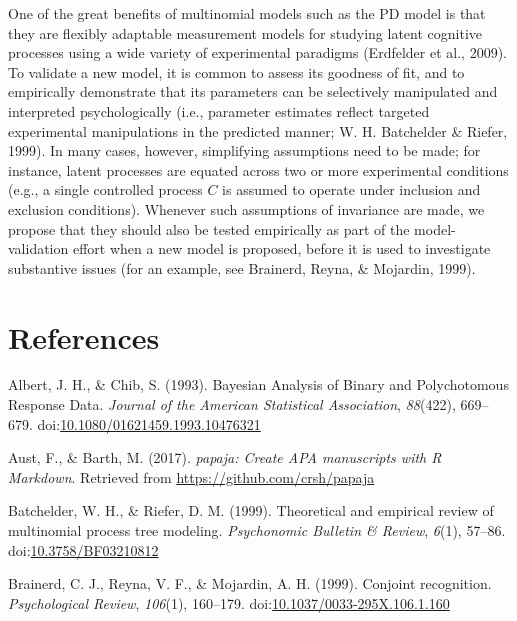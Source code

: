 \documentclass[man]{apa6}
\theoremstyle{definition}
\theoremstyle{definition}
\theoremstyle{definition}
\theoremstyle{remark}
\begin{document}
One of the great benefits of multinomial models such as the PD model is
that they are flexibly adaptable measurement models for studying latent
cognitive processes using a wide variety of experimental paradigms
(Erdfelder et al., 2009). To validate a new model, it is common to
assess its goodness of fit, and to empirically demonstrate that its
parameters can be selectively manipulated and interpreted
psychologically (i.e., parameter estimates reflect targeted experimental
manipulations in the predicted manner; W. H. Batchelder \& Riefer,
1999). In many cases, however, simplifying assumptions need to be made;
for instance, latent processes are equated across two or more
experimental conditions (e.g., a single controlled process \(C\) is
assumed to operate under inclusion and exclusion conditions). Whenever
such assumptions of invariance are made, we propose that they should
also be tested empirically as part of the model-validation effort when a
new model is proposed, before it is used to investigate substantive
issues (for an example, see Brainerd, Reyna, \& Mojardin, 1999).

\clearpage

\section{References}\label{references}

\setlength{\parindent}{-0.5in} \setlength{\leftskip}{0.5in}
\setlength{\parskip}{8pt}

\hypertarget{refs}{}
\hypertarget{ref-albert_bayesian_1993}{}
Albert, J. H., \& Chib, S. (1993). Bayesian Analysis of Binary and
Polychotomous Response Data. \emph{Journal of the American Statistical
Association}, \emph{88}(422), 669--679.
doi:\href{https://doi.org/10.1080/01621459.1993.10476321}{10.1080/01621459.1993.10476321}

\hypertarget{ref-R-papaja}{}
Aust, F., \& Barth, M. (2017). \emph{papaja: Create APA manuscripts with
R Markdown}. Retrieved from \url{https://github.com/crsh/papaja}

\hypertarget{ref-batchelder_theoretical_1999}{}
Batchelder, W. H., \& Riefer, D. M. (1999). Theoretical and empirical
review of multinomial process tree modeling. \emph{Psychonomic Bulletin
\& Review}, \emph{6}(1), 57--86.
doi:\href{https://doi.org/10.3758/BF03210812}{10.3758/BF03210812}

\hypertarget{ref-brainerd_conjoint_1999}{}
Brainerd, C. J., Reyna, V. F., \& Mojardin, A. H. (1999). Conjoint
recognition. \emph{Psychological Review}, \emph{106}(1), 160--179.
doi:\href{https://doi.org/10.1037/0033-295X.106.1.160}{10.1037/0033-295X.106.1.160}
\end{document}
